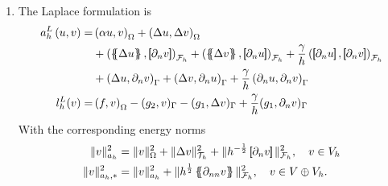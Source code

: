 \begin{enumerate}[label=\arabic*)]
\item The Laplace formulation is
    \begin{equation}
        \label{eq:cip_laplace_form}
        \begin{split}
            a_{h}^{L} \left( u, v \right)   =&
            \left( \alpha  u, v \right) _{\Omega }   +  \left( \Delta  u, \Delta v \right) _{ \Omega } \\
                                             & + \left( \mean{  \Delta  u }, \jump{ \partial _{n }v} \right)_{\mathcal{F}_{h}  }  + \left( \mean{ \Delta  v }, \jump{ \partial _{n}u }      \right)_{\mathcal{F}_{h}  }  + \frac{\gamma }{h}  \left( \jump{ \partial _{n} u}, \jump{ \partial _{n} v   }   \right)_{\mathcal{F}_{h} } \\
                                             & + \left(   \Delta  u ,  \partial _{n }v \right)_{\Gamma   }  + \left(  \Delta  v ,  \partial _{n}u       \right)_{\Gamma  }  + \frac{\gamma }{h}  \left(  \partial _{n} u,  \partial _{n} v      \right)_{ \Gamma } \\
                                             l^{L}_{h}( v)  =&  \left( f, v \right) _{\Omega } - ( g_{2},  v )_{\Gamma } -  ( g_{1}, \Delta  v  )_{\Gamma }  + \frac{\gamma }{h} ( g_{1}, \partial _{n} v  )_{\Gamma }
                                         \end{split}
                                     \end{equation}
                                     With the corresponding energy norms
                                     \begin{equation}
                                         \label{eq:a_cip_energy_norm}
                                         \begin{split}
                                             \| v \|_{ a_{h} }^{ 2 }& =  \| v\|_{ \Omega  }^{2  }  +  \| \Delta   v \|_{ \mathcal{T} _{h}  }^{ 2 }  + \|  h^{-\frac{1}{2}} \jump{ \partial _{n} v    }\|_{  \mathcal{F} _{h} }^{2  },  \quad v \in V_{h}  \\
                                             \| v \|_{ a_{h},* }^{ 2 } &= \| v \|_{ a_{h} }^{ 2 }  + \| h^{\frac{1}{2}}  \mean{     \partial _{nn } v}  \|_{ \mathcal{F}_{h}   }^{  2}, \quad  v\in V \oplus V_{h}.
                                         \end{split}
                                     \end{equation}


\end{enumerate}


